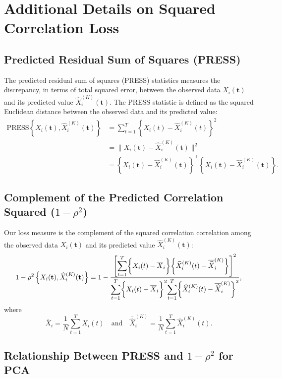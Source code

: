 \section{Additional Details on Squared Correlation Loss} \label{sec:squared-correlation}


\subsection{Predicted Residual Sum of Squares (PRESS)}

The predicted residual sum of squares (PRESS) statistics measures the discrepancy, in terms of total squared error, between the observed data $X_i (\mathbf{t})$ and its predicted value $\widehat{X}^{(K)}_{i} (\mathbf{t})$. 
The PRESS statistic is defined as the squared Euclidean distance between the observed data and its predicted value:
\begin{align*}
    \text{PRESS}\left\{X_i (\mathbf{t}), \widehat{X}^{(K)}_{i} (\mathbf{t}) \right\} 
&= 
\sum_{t = 1}^T \left\{ X_{i}(t) - \widehat{X}^{(K)}_{i} (t)\right\}^2 \\
&=
\bigg\| X_i (\mathbf{t}) - \widehat{X}^{(K)}_{i} (\mathbf{t}) \bigg\|^2\\
&=
\left\{X_i (\mathbf{t}) - \widehat{X}^{(K)}_{i} (\mathbf{t})\right\}^\top \left\{X_i (\mathbf{t}) - \widehat{X}^{(K)}_{i} (\mathbf{t})\right\}.
\end{align*}

\subsection{Complement of the Predicted Correlation Squared ($1-\rho^2$)}

Our loss measure is the complement of the squared correlation correlation among the observed data $X_i (\mathbf{t})$ and its predicted value $\widehat{X}^{(K)}_{i} (\mathbf{t})$:
$$
1- \rho^2 \left\{X_i (\mathbf{t}), \widehat{X}^{(K)}_{i} (\mathbf{t}) \right\} =
1 - \frac{\left[ \mathlarger{\sum}_{t = 1}^T{\bigg\{X_i (t) - \overline{X}_i \bigg\} \bigg\{ \widehat{X}_i^{(K)} (t) - \overline{\widehat{X}}_i^{(K)} \bigg\}} \right]^2}{\mathlarger{\sum}_{t = 1}^T \bigg\{X_i (t) - \overline{X}_i \bigg\}^2 \mathlarger{\sum}_{t = 1}^T \bigg\{ \widehat{X}_i^{(K)} (t) - \overline{\widehat{X}}_i^{(K)} \bigg\} ^2},
$$
where
$$
\overline{X}_i = \frac{1}{N} \sum_{t=1}^T X_i (t) \quad \text{and} \quad \overline{\widehat{X}}_i^{(K)} = \frac{1}{N} \sum_{t=1}^T \widehat{X}_i^{(K)} (t).
$$

\subsection{Relationship Between PRESS and $1-\rho^2$ for PCA}

